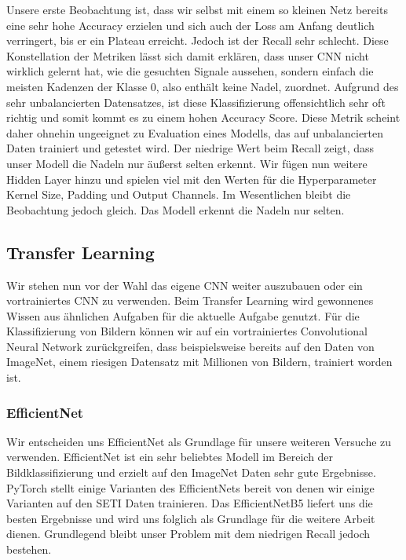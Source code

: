 \documentclass[12pt, a4paper]{article}
\begin{document}
Unsere erste Beobachtung ist, dass wir selbst mit einem so kleinen Netz bereits eine sehr hohe Accuracy erzielen und sich auch der Loss am Anfang deutlich verringert, bis er ein Plateau erreicht. Jedoch ist der Recall sehr schlecht. Diese Konstellation der Metriken lässt sich damit erklären, dass unser CNN nicht wirklich gelernt hat, wie die gesuchten Signale aussehen, sondern einfach die meisten Kadenzen der Klasse 0, also enthält keine Nadel, zuordnet. Aufgrund des sehr unbalancierten Datensatzes, ist diese Klassifizierung offensichtlich sehr oft richtig und somit kommt es zu einem hohen Accuracy Score. Diese Metrik scheint daher ohnehin ungeeignet zu Evaluation eines Modells, das auf unbalancierten Daten trainiert und getestet wird. Der niedrige Wert beim Recall zeigt, dass unser Modell die Nadeln nur äußerst selten erkennt. Wir fügen nun weitere Hidden Layer hinzu und spielen viel mit den Werten für die Hyperparameter Kernel Size, Padding und Output Channels. Im Wesentlichen bleibt die Beobachtung jedoch gleich. Das Modell erkennt die Nadeln nur selten.

\subsection{Transfer Learning}
Wir stehen nun vor der Wahl das eigene CNN weiter auszubauen oder ein vortrainiertes CNN zu verwenden. Beim Transfer Learning wird gewonnenes Wissen aus ähnlichen Aufgaben für die aktuelle Aufgabe genutzt. Für die Klassifizierung von Bildern können wir auf ein vortrainiertes Convolutional Neural Network zurückgreifen, dass beispielsweise bereits auf den Daten von ImageNet, einem riesigen Datensatz mit Millionen von Bildern, trainiert worden ist.

\subsubsection{EfficientNet}
Wir entscheiden uns EfficientNet als Grundlage für unsere weiteren Versuche zu verwenden. EfficientNet ist ein sehr beliebtes Modell im Bereich der Bildklassifizierung und erzielt auf den ImageNet Daten sehr gute Ergebnisse. PyTorch stellt einige Varianten des EfficientNets bereit von denen wir einige Varianten auf den SETI Daten trainieren. Das EfficientNetB5 liefert uns die besten Ergebnisse und wird uns folglich als Grundlage für die weitere Arbeit dienen. Grundlegend bleibt unser Problem mit dem niedrigen Recall jedoch bestehen.
\end{document}
